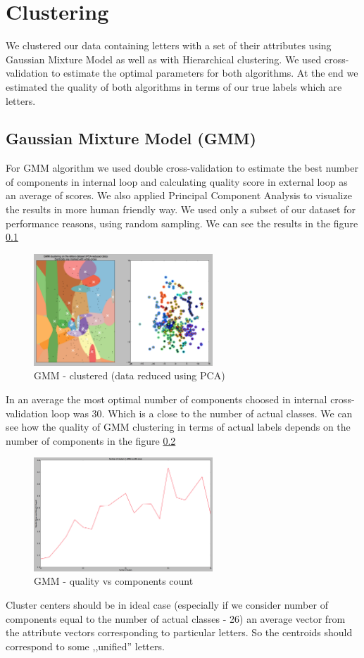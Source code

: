 \chapter*{Clustering}
\setcounter{chapter}{1}
We clustered our data containing letters with a set of their attributes using
Gaussian Mixture Model as well as with Hierarchical clustering. We used
cross-validation to estimate the optimal parameters for both algorithms. At
the end we estimated the quality of both algorithms in terms of our true labels
which are letters.


\section{Gaussian Mixture Model (GMM)}
For GMM algorithm we used double cross-validation to estimate the best number of
components in internal loop and calculating quality score in external loop as
an average of scores. We also applied Principal Component Analysis to visualize
the results in more human friendly way. We used only a subset of our dataset for
performance reasons, using random sampling. We can see the results in the figure
\ref{fig:GMM}
\begin{figure}[!tbh]
  \centering
  \includegraphics[width=0.6\textwidth]{figures/GMM_pca_2_2}
  \caption{GMM - clustered (data reduced using PCA)}
  \label{fig:GMM}
\end{figure}
In an average the most optimal number of components choosed in internal
cross-validation loop was 30. Which is a close to the number of actual classes.
We can see how the quality of GMM clustering in terms of actual labels depends
on the number of components in the figure \ref{fig:ami}
\begin{figure}[!tbh]
  \centering
  \includegraphics[width=0.6\textwidth]{figures/ami}
  \caption{GMM - quality vs components count}
  \label{fig:ami}
\end{figure}
Cluster centers should be in ideal case (especially if we consider number of
components equal to the number of actual classes - 26) an average vector from
the attribute vectors corresponding to particular letters. So the centroids
should correspond to some ,,unified'' letters.


